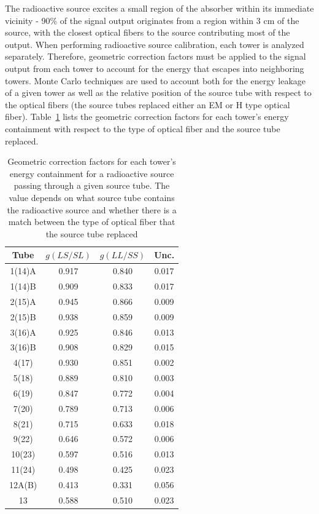 The radioactive source excites a small region of the absorber within its immediate vicinity - 90\% of the signal output originates from a region within 3 cm of the source, with the closest optical fibers to the source contributing  most of the output. When performing radioactive source calibration, each tower is analyzed separately. Therefore, geometric correction factors must be applied to the signal output from each tower to account for the energy that escapes into neighboring towers. Monte Carlo techniques are used to account both for the energy leakage of a given tower as well as the relative position of the source tube with respect to the optical fibers (the source tubes replaced
either an EM or H type optical fiber). Table~\ref{tab:hf_description_gcfactors} lists the geometric correction factors for each tower's energy containment with respect to the type of optical fiber and the source tube replaced.
\begin{table}[htb]
  \centering
  \caption{Geometric correction factors for each tower's energy containment for a radioactive source
  passing through a given source tube. The value depends on what source tube contains the radioactive
  source and whether there is a match between the type of optical fiber that the source tube replaced}
  \begin{tabular}{|c|c|c|c|}
  \hline
  Tube & $g(LS/SL)$ & $g(LL/SS)$ & Unc. \\
  \hline
  1(14)A & 0.917 & 0.840 & 0.017 \\
  1(14)B & 0.909 & 0.833 & 0.017 \\
  2(15)A & 0.945 & 0.866 & 0.009 \\
  2(15)B & 0.938 & 0.859 & 0.009 \\
  3(16)A & 0.925 & 0.846 & 0.013 \\
  3(16)B & 0.908 & 0.829 & 0.015 \\
  4(17)  & 0.930 & 0.851 & 0.002 \\
  5(18)  & 0.889 & 0.810 & 0.003 \\
  6(19)  & 0.847 & 0.772 & 0.004 \\
  7(20)  & 0.789 & 0.713 & 0.006 \\
  8(21)  & 0.715 & 0.633 & 0.018 \\
  9(22)  & 0.646 & 0.572 & 0.006 \\
  10(23) & 0.597 & 0.516 & 0.013 \\
  11(24) & 0.498 & 0.425 & 0.023 \\
  12A(B) & 0.413 & 0.331 & 0.056 \\
  13     & 0.588 & 0.510 & 0.023 \\
  \hline
  \end{tabular}
  \label{tab:hf_description_gcfactors}
\end{table}

